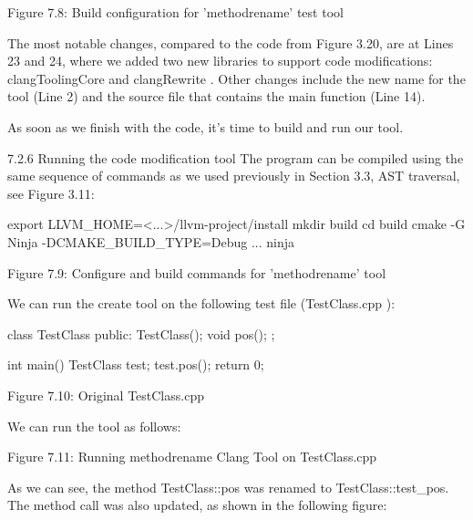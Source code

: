 \begin{center}
Figure 7.8: Build configuration for ’methodrename’ test tool
\end{center}

The most notable changes, compared to the code from Figure 3.20, are at Lines 23 and 24, where we added two new libraries to support code modifications: clangToolingCore and clangRewrite . Other changes include the new name for the tool (Line 2) and the source file that contains the main function (Line 14).

As soon as we finish with the code, it’s time to build and run our tool.

7.2.6 Running the code modification tool
The program can be compiled using the same sequence of commands as we used previously in Section 3.3, AST traversal, see Figure 3.11:

\begin{shell}
export LLVM_HOME=<...>/llvm-project/install
mkdir build
cd build
cmake -G Ninja -DCMAKE_BUILD_TYPE=Debug ...
ninja
\end{shell}

\begin{center}
Figure 7.9: Configure and build commands for ’methodrename’ tool
\end{center}

We can run the create tool on the following test file (TestClass.cpp ):

\begin{cpp}
class TestClass {
public:
  TestClass(){};
  void pos(){};
};

int main() {
  TestClass test;
  test.pos();
  return 0;
}
\end{cpp}


\begin{center}
Figure 7.10: Original TestClass.cpp
\end{center}

We can run the tool as follows:



\begin{center}
Figure 7.11: Running methodrename Clang Tool on TestClass.cpp
\end{center}

As we can see, the method TestClass::pos was renamed to TestClass::test\_pos. The method call was also updated, as shown in the following figure:

